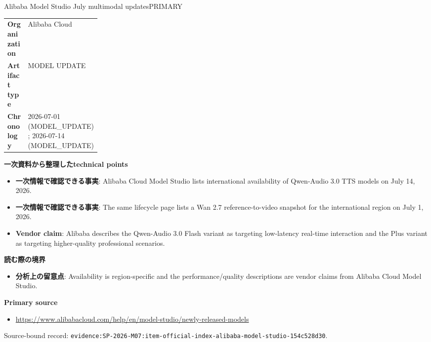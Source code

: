 \begin{technicalnote}{Alibaba Model Studio July multimodal updates}{PRIMARY}
\begin{tabularx}{\linewidth}{@{}>{\bfseries}p{0.22\linewidth}X@{}}
Organization & Alibaba Cloud \\
Artifact type & MODEL UPDATE \\
Chronology & 2026-07-01 (MODEL\_UPDATE); 2026-07-14 (MODEL\_UPDATE) \\
\end{tabularx}
\smallskip
{\bfseries 一次資料から整理したtechnical points}
\begin{itemize}[leftmargin=1.5em,itemsep=0.35em]
\item \textbf{一次情報で確認できる事実}: Alibaba Cloud Model Studio lists international availability of Qwen-Audio 3.0 TTS models on July 14, 2026.
\item \textbf{一次情報で確認できる事実}: The same lifecycle page lists a Wan 2.7 reference-to-video snapshot for the international region on July 1, 2026.
\item \textbf{Vendor claim}: Alibaba describes the Qwen-Audio 3.0 Flash variant as targeting low-latency real-time interaction and the Plus variant as targeting higher-quality professional scenarios.
\end{itemize}
{\bfseries 読む際の境界}
\begin{itemize}[leftmargin=1.5em,itemsep=0.35em]
\item \textbf{分析上の留意点}: Availability is region-specific and the performance/quality descriptions are vendor claims from Alibaba Cloud Model Studio.
\end{itemize}
{\bfseries Primary source}
\begingroup\sloppy
\begin{itemize}[leftmargin=1.5em,itemsep=0.25em]
\item {\scriptsize\url{https://www.alibabacloud.com/help/en/model-studio/newly-released-models}}
\end{itemize}
\endgroup
{\scriptsize\color{SurveyMuted}Source-bound record: \texttt{evidence:SP-2026-M07:item-official-index-alibaba-model-studio-154c528d30}.}
\end{technicalnote}
\medskip
